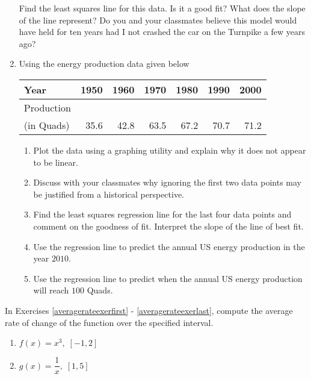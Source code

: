 \documentclass{ximera}
\begin{document}
\begin{enumerate}
\normalsize

\medskip

\noindent Find the least squares line for this data.  Is it a good fit?  What does the slope of the line represent?  Do you and your classmates believe this model would have held for ten years had I not crashed the car on the Turnpike a few years ago?


\item Using the energy production data given below

\noindent \begin{tabular}{|l|r|r|r|r|r|r|} \hline
Year & 1950 & 1960 & 1970 & 1980 & 1990 & 2000 \\
\hline
Production & & & & & & \\
(in Quads) & 35.6 & 42.8 & 63.5 & 67.2 & 70.7 & 71.2 \\ \hline
\end{tabular}

\begin{enumerate}

\item  Plot the data using a graphing utility and explain why it does not appear to be linear.

\item  Discuss with your classmates why ignoring the first two data points may be justified from a historical perspective.

\item Find the least squares regression line for the last four data points and comment on the goodness of fit. Interpret the slope of the line of best fit.

\item  Use the regression line to predict the annual US energy production in the year $2010$.

\item  Use the regression line to predict when the annual US energy production will reach $100$ Quads.

\end{enumerate}



\setcounter{HW}{\value{enumi}}
\end{enumerate}


In Exercises \ref{averagerateexerfirst} - \ref{averagerateexerlast}, compute the average rate of change of the  function over the specified interval.

\begin{multicols}{2}
\begin{enumerate}
\setcounter{enumi}{\value{HW}}

\item $f(x) = x^{3}, \; [-1, 2]$  \label{averagerateexerfirst}
\item $g(x) = \dfrac{1}{x}, \; [1, 5]$

\setcounter{HW}{\value{enumi}}
\end{enumerate}
\end{multicols}
\end{document}

